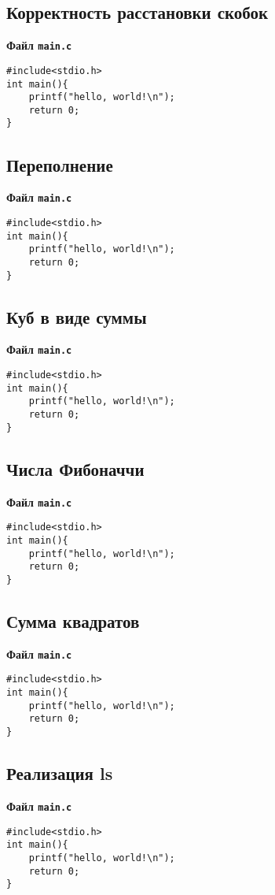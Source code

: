 \documentclass[a4paper,14pt]{extarticle}
\begin{document}
\subsection{Корректность расстановки скобок}\label{code:scobe}
\centerline{\textbf{Файл \texttt{main.c}}}
\begin{verbatim}
#include<stdio.h>
int main(){	
	printf("hello, world!\n");
	return 0;
}
\end{verbatim}
\hrulefill

\subsection{Переполнение}\label{code:overfull}
\centerline{\textbf{Файл \texttt{main.c}}}
\begin{verbatim}
#include<stdio.h>
int main(){	
	printf("hello, world!\n");
	return 0;
}
\end{verbatim}
\hrulefill

\subsection{Куб в виде суммы}\label{code:cube}
\centerline{\textbf{Файл \texttt{main.c}}}
\begin{verbatim}
#include<stdio.h>
int main(){	
	printf("hello, world!\n");
	return 0;
}
\end{verbatim}
\hrulefill

\subsection{Числа Фибоначчи}\label{code:fib}
\centerline{\textbf{Файл \texttt{main.c}}}
\begin{verbatim}
#include<stdio.h>
int main(){	
	printf("hello, world!\n");
	return 0;
}
\end{verbatim}
\hrulefill

\subsection{Сумма квадратов}\label{code:summ}
\centerline{\textbf{Файл \texttt{main.c}}}
\begin{verbatim}
#include<stdio.h>
int main(){	
	printf("hello, world!\n");
	return 0;
}
\end{verbatim}
\hrulefill

\subsection{Реализация ls}\label{code:ls}
\centerline{\textbf{Файл \texttt{main.c}}}
\begin{verbatim}
#include<stdio.h>
int main(){	
	printf("hello, world!\n");
	return 0;
}
\end{verbatim}
\hrulefill
\end{document}
